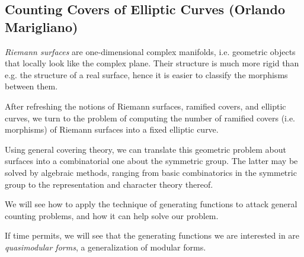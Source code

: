 \subsection{Counting Covers of Elliptic Curves (Orlando Marigliano)}

\emph{Riemann surfaces} are one-dimensional complex manifolds, i.e.
geometric objects that locally look like the complex plane. Their structure
is much more rigid than e.g. the structure of a real surface, hence it is
easier to classify the morphisms between them.

After refreshing the notions of Riemann surfaces, ramified covers, and
elliptic curves, we turn to the problem of computing the number of ramified
covers (i.e. morphisms) of Riemann surfaces into a fixed elliptic curve.

Using general covering theory, we can translate this geometric problem about
surfaces into
a combinatorial one about the symmetric group. The latter may be solved by
algebraic methods, ranging from basic
combinatorics in the symmetric group to the representation and character
theory thereof.

We will see how to apply the technique of generating functions to attack
general counting problems, and how it can help solve our problem.

If time permits, we will see that the generating functions we are interested
in are \emph{quasimodular forms}, a generalization of modular forms.
